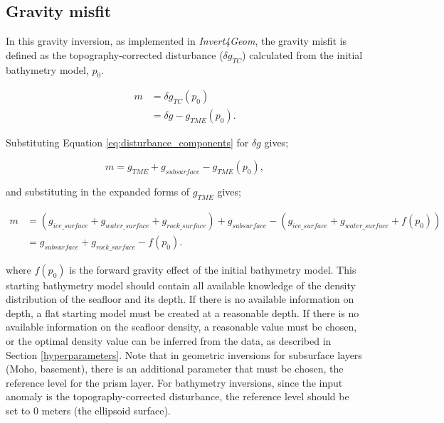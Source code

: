 \documentclass[tc, manuscript]{copernicus}
\begin{document}
\subsection{Gravity misfit}\label{app:misfit}
In this gravity inversion, as implemented in \textit{Invert4Geom}, the gravity misfit is defined as the topography-corrected disturbance ($\delta g_{TC}$) calculated from the initial bathymetry model, $p_0$.

\begin{equation} \label{eq:inversion_misfit2}
\begin{aligned}
    {m} &= \delta g_{TC}(p_0) \\
    &= \delta g - g_{TME}(p_0).
\end{aligned}
\end{equation}

Substituting Equation \ref{eq:disturbance_components} for $\delta g$ gives;

\begin{equation} \label{eq:inversion_misfit3}
    {m} = g_{TME} + g_{subsurface} - g_{TME}(p_0),
\end{equation}

\noindent
and substituting in the expanded forms of $g_{TME}$ gives;

\begin{equation} \label{eq:inversion_misfit4}
\begin{aligned}
    {m} &= (g_{ice{\_}surface} + g_{water{\_}surface} + g_{rock{\_}surface}) + g_{subsurface} - (g_{ice{\_}surface} + g_{water{\_}surface} + f(p_0)) \\
    &= g_{subsurface} + g_{rock{\_}surface} - f(p_0).
\end{aligned}
\end{equation}

\noindent
where $f(p_0)$ is the forward gravity effect of the initial bathymetry model. This starting bathymetry model should contain all available knowledge of the density distribution of the seafloor and its depth. If there is no available information on depth, a flat starting model must be created at a reasonable depth. If there is no available information on the seafloor density, a reasonable value must be chosen, or the optimal density value can be inferred from the data, as described in Section \ref{hyperparameters}. Note that in geometric inversions for subsurface layers (Moho, basement), there is an additional parameter that must be chosen, the reference level for the prism layer. For bathymetry inversions, since the input anomaly is the topography-corrected disturbance, the reference level should be set to 0 meters (the ellipsoid surface).
\end{document}
